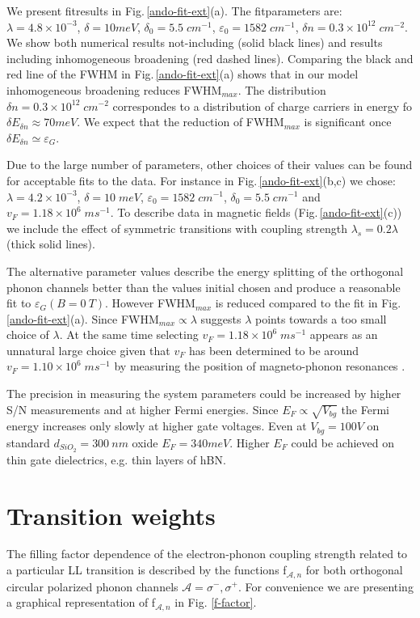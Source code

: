 \documentclass[pra,aps,superscriptaddress,preprint]{revtex4-1}
\begin{document}
We present fitresults in Fig.\,\ref{ando-fit-ext}(a). The fitparameters are: $\lambda = 4.8\times 10^{-3}$, $\delta = 10meV$, $\delta_0=5.5\; cm^{-1}$, $\varepsilon_0 = 1582\; cm^{-1}$, $\delta n = 0.3\times 10^{12}\; cm^{-2}$. We show both numerical results not-including (solid black lines) and results including inhomogeneous broadening (red dashed lines).
Comparing the black and red line of the FWHM in Fig.\,\ref{ando-fit-ext}(a) shows that in our model inhomogeneous broadening reduces FWHM$_{max}$. The distribution $\delta n = 0.3\times 10^{12}\; cm^{-2}$ correspondes to a distribution of charge carriers in energy fo $\delta E_{\delta n} \approx 70meV$. We expect that the reduction of FWHM$_{max}$ is significant once $\delta E_{\delta n}\simeq \varepsilon_G$.

Due to the large number of parameters, other choices of their values can be found for acceptable fits to the data. For instance in Fig.\,\ref{ando-fit-ext}(b,c) we chose: $\lambda=4.2\times 10^{-3}$, $\delta=10\; meV$, $\varepsilon_0=1582\; cm^{-1}$, $\delta_0=5.5\; cm^{-1}$ and $v_F=1.18\times 10^6 \; ms^{-1}$. To describe data in magnetic fields (Fig.\,\ref{ando-fit-ext}(c)) we include the effect of symmetric transitions with coupling strength $\lambda_s=0.2\lambda$ (thick solid lines).

\noindent
The alternative parameter values describe the energy splitting of the orthogonal phonon channels better than the values initial chosen and produce a reasonable fit to $\varepsilon_G(B=0\: T)$. However FWHM$_{max}$ is reduced compared to the fit in Fig.\,\ref{ando-fit-ext}(a). Since FWHM$_{max}\propto \lambda$ suggests $\lambda$ points towards a too small choice of $\lambda$. At the same time selecting $v_F = 1.18\times 10^6 \; ms^{-1}$ appears as an unnatural large choice given that $v_F$ has been determined to be around $v_F=1.10\times 10^6 \; ms^{-1}$ by measuring the position of magneto-phonon resonances \cite{kossacki2012circular,PhysRevLett.110.227402}. 

\noindent
The precision in measuring the system parameters could be increased by higher S/N measurements and at higher Fermi energies. Since $E_F \propto \sqrt{V_{bg}}$ the Fermi energy increases only slowly at higher gate voltages. Even at $V_{bg} = 100V$ on standard $d_{SiO_2}=300\: nm$ oxide $E_F = 340meV$. Higher $E_F$ could be achieved on thin gate dielectrics, e.g. thin layers of hBN. 

\newpage
\section{Transition weights}
The filling factor dependence of the electron-phonon coupling strength related to a particular LL transition is described by the functions f$_{\mathcal{A},n}$ for both orthogonal circular polarized phonon channels $\mathcal{A}=\sigma^-, \sigma^+$. For convenience we are presenting a graphical representation of f$_{\mathcal{A},n}$ in Fig. \ref{f-factor}.  
\end{document}
